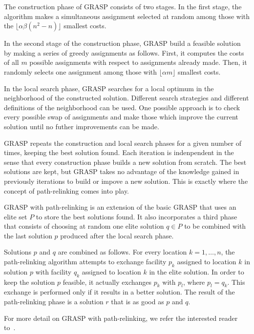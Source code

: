 \documentclass{bioinfo}
\begin{document}
The construction phase of GRASP consists of two stages. In the first stage, the algorithm makes a simultaneous assignment selected at random among those with the $\lfloor \alpha \beta (n^2 - n) \rfloor$ smallest costs.

In the second stage of the construction phase, GRASP build a feasible solution by making 
a series of greedy assignments as follows. First, it computes the costs of all $m$ possible assignments with respect to assignments already made. Then, it randomly selects one assignment among those with $\lfloor \alpha m \rfloor$ smallest costs.

In the local search phase, GRASP searches for a local optimum in the neighborhood of the constructed solution. Different search strategies and different definitions of the neighborhood can be used. One possible approach is to check every possible swap of assignments and make those which improve the current solution until no futher improvements can be made.

GRASP repeats the construction and local search phases for a given number of times, keeping the best solution found. Each iteration is indenpendent in the sense that every construction phase builds a new solution from scratch. The best solutions are kept, but GRASP takes no advantage of the knowledge gained in previously iterations to build or impove a new solution. This is exactly where the concept of path-relinking comes into play.

GRASP with path-relinking is an extension of the basic GRASP that uses an elite set $P$ to store the best solutions found. It also incorporates a third phase that consists of choosing at random one elite solution $q \in P$  to be combined with the last solution $p$ produced after the local search phase.

Solutions $p$ and $q$ are combined as follows. For every location $k = 1, \ldots, n$, the path-relinking algorithm attempts to exchange facility $p_k$ assigned to location $k$ in  solution $p$ with facility $q_k$ assigned to location $k$ in the elite solution. In order to keep the solution $p$ feasible, it actually exchanges $p_k$ with $p_l$, where $p_l = q_k$. This exchange is performed only if it results in a better solution. The result of the path-relinking phase is a solution $r$ that is as good as $p$ and $q$.

For more detail on GRASP with path-relinking, we refer the interested reader to~\citealp{OLIVEIRA04}.

\end{document}
